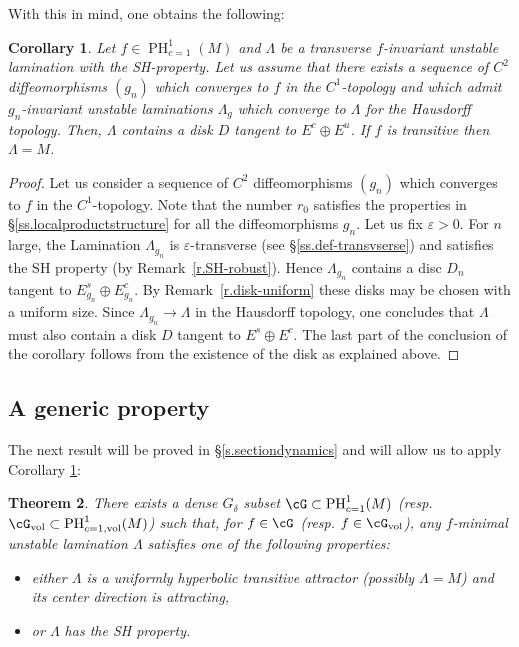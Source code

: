 \documentclass[a4paper,11pt]{amsart}
\numberwithin{equation}{section}     %
\newtheorem{teo}{Theorem}[section]
\newtheorem{cor}[teo]{Corollary}
\theoremstyle{definition}
\theoremstyle{remark}
\DeclareMathOperator{\PH}{PH}
\begin{document}
With this in mind, one obtains the following:

\begin{cor}\label{cor-ACW}
Let $f \in \PH^1_{c=1}(M)$ and $\Lambda$ be a transverse $f$-invariant unstable lamination with the SH-property.
Let us assume that there exists a sequence of $C^2$ diffeomorphisms $(g_n)$ which converges to $f$ in the $C^1$-topology and which admit $g_n$-invariant unstable laminations $\Lambda_g$ which converge to $\Lambda$ for the Hausdorff topology. Then, $\Lambda$ contains a disk $D$ tangent to $E^c \oplus E^u$. If $f$ is transitive then $\Lambda=M$. 
\end{cor}

\begin{proof}
Let us consider a sequence of $C^2$ diffeomorphisms $(g_n)$ which converges to $f$ in the $C^1$-topology.
Note that the number $r_0$ satisfies the properties in \S\ref{ss.localproductstructure} for all the diffeomorphisms $g_n$. Let us fix $\varepsilon>0$. For $n$ large, the Lamination $\Lambda_{g_n}$ is $\varepsilon$-transverse (see \S\ref{ss.def-transvserse}) and satisfies the SH property (by Remark~\ref{r.SH-robust}). Hence $\Lambda_{g_n}$ contains a disc $D_n$ tangent to $E^s_{g_n} \oplus E^{c}_{g_n}$.
By Remark~\ref{r.disk-uniform} these disks may be chosen with a uniform size.
Since $\Lambda_{g_n} \to \Lambda$ in the Hausdorff topology, one concludes that $\Lambda$ must also contain a disk $D$ tangent to $E^s \oplus E^c$. 
The last part of the conclusion of the corollary follows from the existence of the disk as explained above.
\end{proof}

\subsection{A generic property} 

The next result will be proved in \S\ref{s.sectiondynamics} and will allow us to apply Corollary \ref{cor-ACW}:

\begin{teo}\label{T.SHorQA} 
There exists a dense $G_\delta$ subset $\cG \subset \PH^1_{c=1}(M)$  (resp. $\cG_{\mathrm{vol}} \subset \PH^1_{c=1, \mathrm{vol}}(M)$) such that, for $f \in \cG$  (resp. $f \in \cG_{\mathrm{vol}}$), any $f$-minimal unstable lamination $\Lambda$ satisfies one of the following properties:
\begin{itemize}
\item either $\Lambda$ is a uniformly hyperbolic transitive attractor (possibly $\Lambda=M$) and its center direction is attracting,
\item or $\Lambda$ has the SH property. 
\end{itemize} 
\end{teo}
\end{document}
